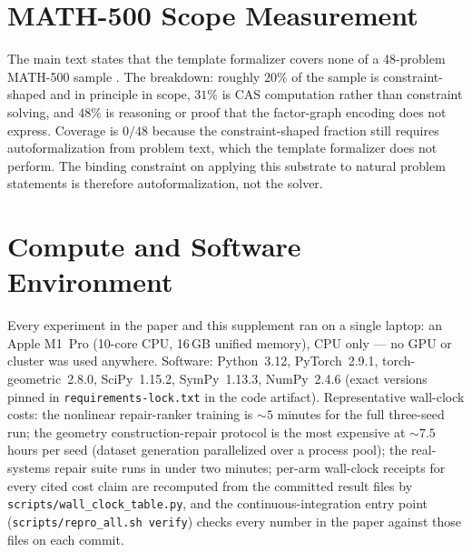 \section{MATH-500 Scope Measurement}
\label{app:math}

The main text states that the template formalizer covers none of a 48-problem MATH-500
sample \citep{hendrycks2021math}. The breakdown: roughly $20\%$ of the sample is
constraint-shaped and in principle in scope, $31\%$ is CAS computation rather than
constraint solving, and $48\%$ is reasoning or proof that the factor-graph encoding does
not express. Coverage is $0/48$ because the constraint-shaped fraction still requires
autoformalization from problem text, which the template formalizer does not perform. The
binding constraint on applying this substrate to natural problem statements is therefore
autoformalization, not the solver.

\section{Compute and Software Environment}
\label{app:compute}

Every experiment in the paper and this supplement ran on a single laptop: an Apple M1~Pro
(10-core CPU, 16\,GB unified memory), CPU only --- no GPU or cluster was used anywhere.
Software: Python~3.12, PyTorch~2.9.1, torch-geometric~2.8.0, SciPy~1.15.2, SymPy~1.13.3,
NumPy~2.4.6 (exact versions pinned in \texttt{requirements-lock.txt} in the code artifact).
Representative wall-clock costs: the nonlinear repair-ranker training is ${\sim}5$ minutes
for the full three-seed run; the geometry construction-repair protocol is the most expensive
at ${\sim}7.5$ hours per seed (dataset generation parallelized over a process pool); the
real-systems repair suite runs in under two minutes; per-arm wall-clock receipts for every
cited cost claim are recomputed from the committed result files by
\texttt{scripts/wall\_clock\_table.py}, and the continuous-integration entry point
(\texttt{scripts/repro\_all.sh verify}) checks every number in the paper against those
files on each commit.
